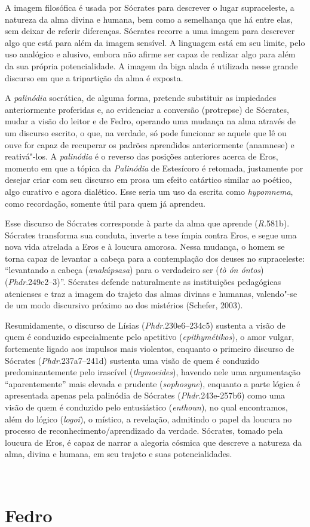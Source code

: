 A imagem filosófica é usada por Sócrates para descrever o lugar
supraceleste, a natureza da alma divina e humana, bem como a semelhança
que há entre elas, sem deixar de referir diferenças. Sócrates recorre a
uma imagem para descrever algo que está para além da imagem sensível. A linguagem está em seu limite, pelo uso analógico e alusivo, embora não
afirme ser capaz de realizar algo para além da sua própria
potencialidade. A imagem da biga alada é utilizada nesse grande discurso
em que a tripartição da alma é exposta.

A \emph{palinódia} socrática, de alguma forma, pretende substituir as
impiedades anteriormente proferidas e, ao evidenciar a conversão
(protrepse) de Sócrates, mudar a visão do leitor e de Fedro, operando
uma mudança na alma através de um discurso escrito, o que, na verdade, só
pode funcionar se aquele que lê ou ouve for capaz de recuperar os
padrões aprendidos anteriormente (anamnese) e reativá"-los.
A \emph{palinódia} é o reverso das posições anteriores acerca de Eros,
momento em que a tópica da \emph{Palinódia} de Estesícoro é retomada,
justamente por desejar criar com seu discurso em prosa um efeito
catártico similar ao poético, algo curativo e agora dialético. Esse
seria um uso da escrita como \emph{hypomnema}, como recordação, somente
útil para quem já aprendeu.

Esse discurso de Sócrates corresponde à parte da alma que aprende
(\emph{R.}581b). Sócrates transforma sua conduta, inverte a tese ímpia
contra Eros, e segue uma nova vida atrelada a Eros e à loucura amorosa.
Nessa mudança, o homem se torna capaz de levantar a cabeça para a
contemplação dos deuses no supraceleste: ``levantando a cabeça
(\emph{anakúpsasa}) para o verdadeiro ser (\emph{tò ón óntos})
(\emph{Phdr}.249c2--3)''. Sócrates defende naturalmente as instituições
pedagógicas atenienses e traz a imagem do trajeto das almas divinas e
humanas, valendo"-se de um modo discursivo próximo ao dos mistérios
(Schefer, 2003).

 

\asterisc{}

 

Resumidamente, o discurso de Lísias (\emph{Phdr}.230e6--234c5) sustenta
a visão de quem é conduzido especialmente pelo apetitivo
(\emph{epithymétikos}), o amor vulgar, fortemente ligado aos impulsos
mais violentos, enquanto o primeiro discurso de Sócrates
(\emph{Phdr}.237a7--241d) sustenta uma visão de quem é conduzido
predominantemente pelo irascível (\emph{thymoeides}), havendo nele uma
argumentação ``aparentemente'' mais elevada e prudente
(\emph{sophosyne}), enquanto a parte lógica é apresentada apenas pela
palinódia de Sócrates (\emph{Phdr}.243e-257b6) como uma visão de quem é
conduzido pelo entusiástico (\emph{enthoun}), no qual encontramos, além
do lógico (\emph{logoi}), o místico, a revelação, admitindo o papel da
loucura no processo de reconhecimento/\allowbreak{}aprendizado da verdade. Sócrates,
tomado pela loucura de Eros, é capaz de narrar a alegoria cósmica que
descreve a natureza da alma, divina e humana, em seu trajeto e suas
potencialidades.

 



​

\part{Fedro}

 
